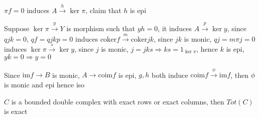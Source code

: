 \documentclass[main]{subfiles}
\begin{document}
\begin{solution}
\begin{center}
\end{center}
$\pi f=0$ induces $A\xrightarrow{h}\ker\pi$, claim that $h$ is epi \par
Suppose $\ker\pi\xrightarrow{y}Y$ is morphism such that $yh=0$, it induces $A\xrightarrow{p}\ker y$, since $qjk=0$, $qf=qjkp=0$ induces $\mathrm{coker}f\xrightarrow{m}\mathrm{coker}jk$, since $jk$ is monic, $qj=m\pi j=0$ induces $\ker\pi\xrightarrow{s}\ker y$, since $j$ is monic, $j=jks\Rightarrow ks=1_{\ker\pi}$, hence $k$ is epi, $yk=0\Rightarrow y=0$
\begin{center}
\end{center}
Since $\mathrm{im}f\to B$ is monic, $A\to\mathrm{coim}f$ is epi, $g,h$ both induce $\mathrm{coim}f\xrightarrow{\phi}\mathrm{im}f$, then $\phi$ is monic and epi hence iso
\begin{center}
\end{center}
\end{solution}

\begin{exercise}\label{bounded double complex with exact rows or exact columns has exact total complex}
$C$ is a bounded double complex with exact rows or exact columns, then $Tot(C)$ is exact
\end{exercise}
\end{document}
